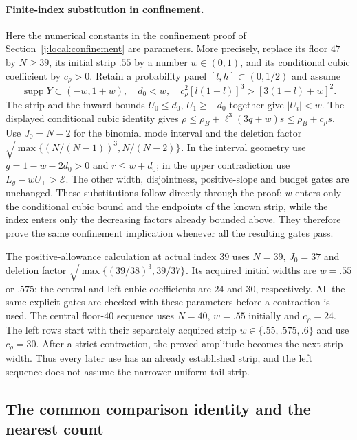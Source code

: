 \paragraph{Finite-index substitution in confinement.}
\label{j:local:finite-confinement}
Here the numerical constants in the confinement proof of
Section~\ref{j:local:confinement} are parameters. More precisely,
replace its floor $47$ by $N\ge39$, its initial strip $.55$ by a
number $w\in(0,1)$, and its conditional cubic coefficient by
$c_\rho>0$. Retain a probability panel $[l,h]\subset(0,1/2)$ and assume
\[
 \operatorname{supp}Y\subset(-w,1+w),\quad d_0<w,
 \quad c_\rho^2[l(1-l)]^3>[3(1-l)+w]^2.
\]
The strip and the inward bounds $U_0\le d_0$, $U_1\ge-d_0$
together give $|U_i|<w$. The displayed conditional cubic identity gives
$\rho\le\rho_B+\ell^3(3q+w)s\le\rho_B+c_\rho s$.
Use $J_0=N-2$ for the binomial mode interval and the deletion factor
$\sqrt{\max\{(N/(N-1))^3,N/(N-2)\}}$. In the interval geometry
use $g=1-w-2d_0>0$ and $r\le w+d_0$; in the upper contradiction
use $L_g-wU_+>\mathcal E$. The other width, disjointness,
positive-slope and budget gates are unchanged. These substitutions
follow directly through the proof: $w$ enters only the conditional
cubic bound and the endpoints of the known strip, while the index
enters only the decreasing factors already bounded above. They
therefore prove the same confinement implication whenever all the
resulting gates pass.

The positive-allowance calculation at actual index $39$ uses $N=39$,
$J_0=37$ and deletion factor
$\sqrt{\max\{(39/38)^3,39/37\}}$. Its acquired initial widths are
$w=.55$ or $.575$; the central and left cubic coefficients are
$24$ and $30$, respectively. All the same explicit gates are checked
with these parameters before a contraction is used.
The central floor-$40$ sequence uses $N=40$, $w=.55$ initially and
$c_\rho=24$. The left rows start with their separately acquired
strip $w\in\{.55,.575,.6\}$ and use $c_\rho=30$. After a strict
contraction, the proved amplitude becomes the next strip width.
Thus every later use has an already established strip, and the
left sequence does not assume the narrower uniform-tail strip.



\subsection{The common comparison identity and the nearest count}\label{j:local:shortloc:section}

